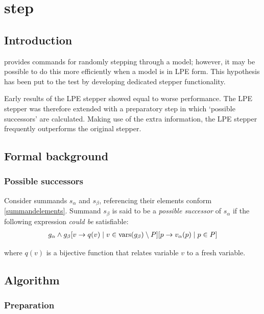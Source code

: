 \chapter{step} \label{stepN}

\section{Introduction}

\txs{} provides commands for randomly stepping through a model; however, it may be possible to do this more efficiently when a model is in LPE form.
This hypothesis has been put to the test by developing dedicated stepper functionality.

Early results of the LPE stepper showed equal to worse performance.
The LPE stepper was therefore extended with a preparatory step in which `possible successors' are calculated.
Making use of the extra information, the LPE stepper frequently outperforms the original \txs{} stepper.

\section{Formal background}

\subsection{Possible successors}

Consider summands $s_\alpha$ and $s_\beta$, referencing their elements conform \ref{summandelements}.
Summand $s_\beta$ is said to be a \emph{possible successor} of $s_\alpha$ if the following expression \emph{could be} satisfiable:
\begin{align*}
g_\alpha \land {g_\beta}[v \rightarrow q(v) \;|\; v \in \text{vars}(g_\beta) \setminus P][p \rightarrow v_\alpha(p) \;|\; p \in P]
\end{align*}

where $q(v)$ is a bijective function that relates variable $v$ to a fresh variable.

\section{Algorithm}

\subsection{Preparation}


